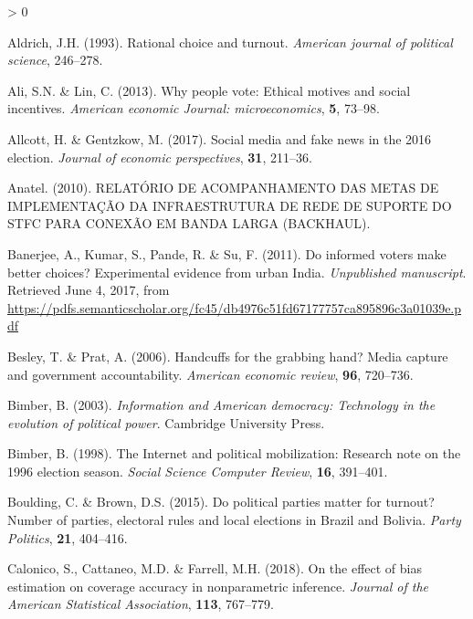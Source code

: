 \documentclass[
  12pt,
]{article}
\newlength{\cslhangindent}
\newenvironment{CSLReferences}[2] %
 {%
  \setlength{\parindent}{0pt}
  \ifodd #1 \everypar{\setlength{\hangindent}{\cslhangindent}}\ignorespaces\fi
  \ifnum #2 > 0
  \setlength{\parskip}{#2\baselineskip}
  \fi
 }%
 {}
\begin{document}
\hypertarget{refs}{}
\begin{CSLReferences}{1}{0}
\leavevmode\hypertarget{ref-aldrich_rational_1993}{}%
Aldrich, J.H. (1993). Rational choice and turnout. \emph{American
journal of political science}, 246--278.

\leavevmode\hypertarget{ref-ali_why_2013}{}%
Ali, S.N. \& Lin, C. (2013). Why people vote: {Ethical} motives and
social incentives. \emph{American economic Journal: microeconomics},
\textbf{5}, 73--98.

\leavevmode\hypertarget{ref-allcott_social_2017}{}%
Allcott, H. \& Gentzkow, M. (2017). Social media and fake news in the
2016 election. \emph{Journal of economic perspectives}, \textbf{31},
211--36.

\leavevmode\hypertarget{ref-anatel_relatorio_2010}{}%
Anatel. (2010). {RELATÓRIO} {DE} {ACOMPANHAMENTO} {DAS} {METAS} {DE}
{IMPLEMENTAÇÃO} {DA} {INFRAESTRUTURA} {DE} {REDE} {DE} {SUPORTE} {DO}
{STFC} {PARA} {CONEXÃO} {EM} {BANDA} {LARGA} ({BACKHAUL}).

\leavevmode\hypertarget{ref-banerjee_informed_2011}{}%
Banerjee, A., Kumar, S., Pande, R. \& Su, F. (2011). Do informed voters
make better choices? {Experimental} evidence from urban {India}.
\emph{Unpublished manuscript}. Retrieved June 4, 2017, from
\url{https://pdfs.semanticscholar.org/fc45/db4976c51fd67177757ca895896c3a01039e.pdf}

\leavevmode\hypertarget{ref-besley_handcuffs_2006}{}%
Besley, T. \& Prat, A. (2006). Handcuffs for the grabbing hand? {Media}
capture and government accountability. \emph{American economic review},
\textbf{96}, 720--736.

\leavevmode\hypertarget{ref-bimber_information_2003}{}%
Bimber, B. (2003). \emph{Information and {American} democracy:
{Technology} in the evolution of political power}. Cambridge University
Press.

\leavevmode\hypertarget{ref-bimber_internet_1998}{}%
Bimber, B. (1998). The {Internet} and political mobilization: {Research}
note on the 1996 election season. \emph{Social Science Computer Review},
\textbf{16}, 391--401.

\leavevmode\hypertarget{ref-boulding_political_2015}{}%
Boulding, C. \& Brown, D.S. (2015). Do political parties matter for
turnout? {Number} of parties, electoral rules and local elections in
{Brazil} and {Bolivia}. \emph{Party Politics}, \textbf{21}, 404--416.

\leavevmode\hypertarget{ref-calonico_effect_2018}{}%
Calonico, S., Cattaneo, M.D. \& Farrell, M.H. (2018). On the effect of
bias estimation on coverage accuracy in nonparametric inference.
\emph{Journal of the American Statistical Association}, \textbf{113},
767--779.


\end{CSLReferences}
\end{document}
